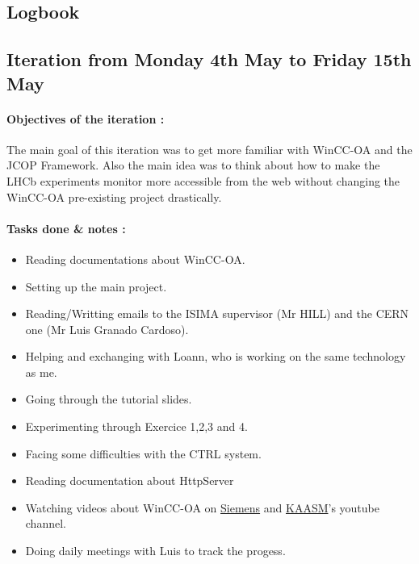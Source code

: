 \documentclass[a4paper, 12pt]{article}
\begin{document}
\newpage
\appendixpage
\begin{appendix}
    \section{Logbook}
    \subsection{Iteration from Monday 4th May to Friday 15th May}
    \paragraph{Objectives of the iteration :} 
    The main goal of this iteration was to get more familiar with WinCC-OA and the JCOP Framework. 
    Also the main idea was to think about how to make the LHCb experiments monitor more accessible from the web without changing the WinCC-OA pre-existing project drastically.
    \paragraph{Tasks done \& notes :}
    \begin{itemize}
        \item Reading documentations about WinCC-OA.
        \item Setting up the main project.
        \item Reading/Writting emails to the ISIMA supervisor (Mr HILL) and the CERN one (Mr Luis Granado Cardoso).
        \item Helping and exchanging with Loann, who is working on the same technology as me.
        \item Going through the tutorial slides.
        \item Experimenting through Exercice 1,2,3 and 4.
        \item Facing some difficulties with the CTRL system.
        \item Reading documentation about HttpServer
        \item Watching videos about WinCC-OA on \href{https://www.youtube.com/user/ETM2011}{Siemens} and \href{https://www.youtube.com/channel/UCGBnHd1-B-Zg9MDsjTk0-Sw}{KAASM}'s youtube channel. 
        \item Doing daily meetings with Luis to track the progess.
    \end{itemize}


\end{appendix}
\end{document}
